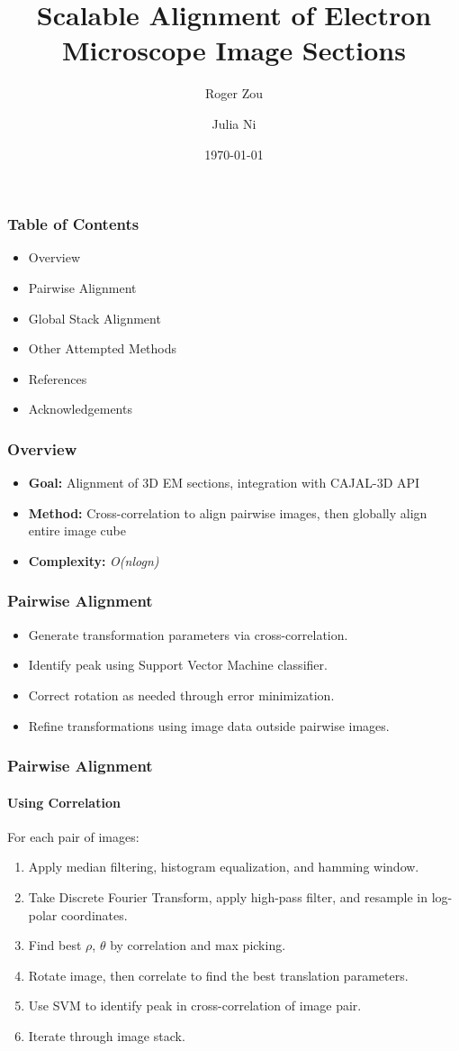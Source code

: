 \documentclass{beamer}
\begin{document}
\title[Scalable EM Alignment] %
{Scalable Alignment of Electron Microscope Image Sections}
\author[Zou, Ni] {Roger Zou \and Julia Ni}
\date{\today}

\frame{\titlepage}

\begin{frame}
\frametitle{Table of Contents}
\begin{itemize}
\item Overview
\item Pairwise Alignment
\item Global Stack Alignment
\item Other Attempted Methods
\item References
\item Acknowledgements 
\end{itemize}
\end{frame}

\begin{frame}
\frametitle{Overview}
\begin{itemize}
\item \textbf{Goal:} Alignment of 3D EM sections, integration with CAJAL-3D API \\
\item \textbf{Method:} Cross-correlation to align pairwise images, then globally align entire image cube \\
\item \textbf{Complexity:} \textit{O(nlogn)}
\end{itemize}
\end{frame}

\begin{frame}
\frametitle{Pairwise Alignment}
\begin{itemize}
\item Generate transformation parameters via cross-correlation.
\item Identify peak using Support Vector Machine classifier.
\item Correct rotation as needed through error minimization.
\item Refine transformations using image data outside pairwise images.
\end{itemize}
\end{frame}

\begin{frame}
\frametitle{Pairwise Alignment}
\framesubtitle{Using Correlation}
For each pair of images: 
\begin{enumerate}
\item Apply median filtering, histogram equalization, and hamming window. 
\item Take Discrete Fourier Transform, apply high-pass filter, and resample in log-polar coordinates. 
\item Find best $\rho$, $\theta$ by correlation and max picking. 
\item Rotate image, then correlate to find the best translation parameters.
\item Use SVM to identify peak in cross-correlation of image pair. 
\item Iterate through image stack. 
\end{enumerate}
\end{frame}
\end{document}

